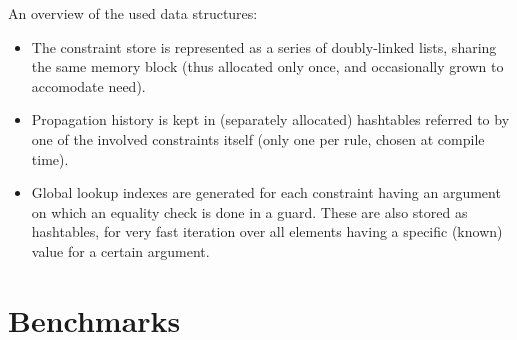 \documentclass{llncs}
\begin{document}
An overview of the used data structures: \begin{itemize}
  \item The constraint store is represented as a series of doubly-linked lists, sharing the same memory block (thus allocated only
        once, and occasionally grown to accomodate need).
  \item Propagation history is kept in (separately allocated) hashtables referred to by one of the involved constraints itself 
        (only one per rule, chosen at compile time).
  \item Global lookup indexes are generated for each constraint having an argument on which an equality check is done in a
        guard. These are also stored as hashtables, for very fast iteration over all elements having a specific (known)
	value for a certain argument.
\end{itemize}

\section{Benchmarks}
\end{document}
